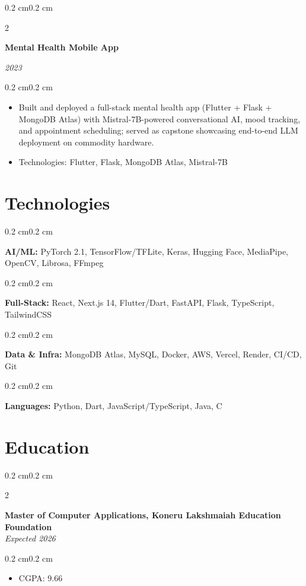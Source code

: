 \documentclass[10pt, a4paper]{article}
\newenvironment{highlights}{
    \begin{itemize}[
        topsep=0.10 cm,
        parsep=0.10 cm,
        partopsep=0pt,
        itemsep=0pt,
        leftmargin=0.4 cm + 10pt
    ]
}{\end{itemize}}
\newenvironment{onecolentry}{
    \begin{adjustwidth}{0.2 cm}{0.2 cm}
}{\end{adjustwidth}}
\newenvironment{twocolentry}[2][]{
    \onecolentry
    \def\secondColumn{#2}
    \setcolumnwidth{\fill, 4.5 cm}
    \begin{paracol}{2}
}{
    \switchcolumn \raggedleft \secondColumn
    \end{paracol}
    \endonecolentry
}
\begin{document}
\vspace{0.15 cm}

\begin{twocolentry}{\textit{2023}}
    \textbf{Mental Health Mobile App}
\end{twocolentry}

\begin{onecolentry}
    \begin{highlights}
        \item Built and deployed a full-stack mental health app (Flutter + Flask + MongoDB Atlas) with Mistral-7B-powered conversational AI, mood tracking, and appointment scheduling; served as capstone showcasing end-to-end LLM deployment on commodity hardware.
        \item Technologies: Flutter, Flask, MongoDB Atlas, Mistral-7B
    \end{highlights}
\end{onecolentry}

\section{Technologies}
\begin{onecolentry}
    \textbf{AI/ML:} PyTorch 2.1, TensorFlow/TFLite, Keras, Hugging Face, MediaPipe, OpenCV, Librosa, FFmpeg
\end{onecolentry}
\vspace{0.1 cm}
\begin{onecolentry}
    \textbf{Full-Stack:} React, Next.js 14, Flutter/Dart, FastAPI, Flask, TypeScript, TailwindCSS
\end{onecolentry}
\vspace{0.1 cm}
\begin{onecolentry}
    \textbf{Data \& Infra:} MongoDB Atlas, MySQL, Docker, AWS, Vercel, Render, CI/CD, Git
\end{onecolentry}
\vspace{0.1 cm}
\begin{onecolentry}
    \textbf{Languages:} Python, Dart, JavaScript/TypeScript, Java, C
\end{onecolentry}

\section{Education}
\begin{twocolentry}{\textit{Expected 2026}}
    \textbf{Master of Computer Applications, Koneru Lakshmaiah Education Foundation} \\
   
\end{twocolentry}
\begin{onecolentry}
    \begin{highlights}
        \item CGPA: 9.66
    \end{highlights}
\end{onecolentry}
\end{document}
